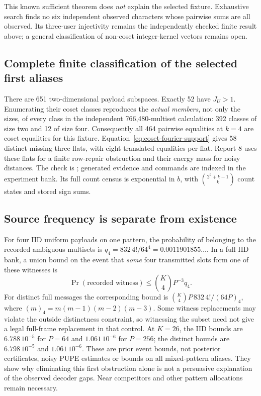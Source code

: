\documentclass[10pt,a4paper]{article}
\begin{document}
This known sufficient theorem does \emph{not} explain the selected fixture. Exhaustive search finds
no six independent observed characters whose pairwise sums are all observed. Its three-user
injectivity remains the independently checked finite result above; a general classification of
non-coset integer-kernel vectors remains open.

\subsection{Complete finite classification of the selected first aliases}
There are 651 two-dimensional payload subspaces. Exactly 52 have $J_U>1$.
Enumerating their coset classes reproduces the \emph{actual members}, not only the sizes, of every
class in the independent 766,480-multiset calculation: 392 classes of size two and 12 of size four.
Consequently all 464 pairwise equalities at $k=4$ are coset equalities for this fixture.
Equation~\eqref{eq:coset-fourier-support} gives 58 distinct missing three-flats, with eight
translated equalities per flat. Report 8 uses these flats for a finite row-repair obstruction and
their energy mass for noisy distances. The check is
; generated evidence and commands are indexed in the experiment bank.
Its full count census is exponential in $b$, with $\binom{2^b+k-1}{k}$ count states and stored sign sums.

\subsection{Source frequency is separate from existence}
For four IID uniform payloads on one pattern, the probability of belonging to the recorded ambiguous
multisets is $q_4=832\,4!/64^4=0.0011901855\ldots$. In a full IID bank, a union bound on the event
that \emph{some} four transmitted slots form one of these witnesses is
\begin{equation}
 \Pr(\text{recorded witness})\leq\binom K4 P^{-3}q_4.
 \label{eq:alias-source-frequency}
\end{equation}
For distinct full messages the corresponding bound is $\binom K4 P\,832\,4!/(64P)_4$,
where $(m)_4=m(m-1)(m-2)(m-3)$. Some witness replacements may violate the outside distinctness
constraint, so witnessing the subset need not give a legal full-frame replacement in that control.
At $K=26$, the IID bounds are $6.788\,10^{-5}$ for $P=64$ and $1.061\,10^{-6}$ for $P=256$;
the distinct bounds are $6.798\,10^{-5}$ and $1.061\,10^{-6}$.
These are prior event bounds, not posterior certificates, noisy PUPE estimates or bounds on all
mixed-pattern aliases. They show why eliminating this first obstruction alone is not a persuasive
explanation of the observed decoder gaps. Near competitors and other pattern allocations remain necessary.
\end{document}
